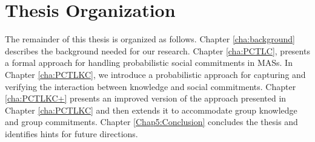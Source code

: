 \section{Thesis Organization}\label{sec:thesis-outline-chap1}
The remainder of this thesis is organized as follows. Chapter \ref{cha:background} describes the background needed for our research. Chapter \ref{cha:PCTLC}, presents a formal approach for handling probabilistic social commitments in MASs. In Chapter \ref{cha:PCTLKC}, we introduce a probabilistic approach for capturing and verifying the interaction between knowledge and social commitments. Chapter \ref{cha:PCTLKC+} presents an improved version of the approach presented in Chapter \ref{cha:PCTLKC} and then extends it to accommodate group knowledge and group commitments. %
Chapter \ref{Chap5:Conclusion} concludes the thesis and identifies hints for future directions.


